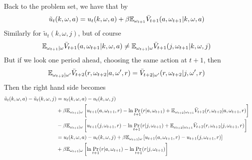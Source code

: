\documentclass[12pt]{article}[margin=1in]
\begin{document}
Back to the problem set, we have that by 
$$ \tilde{u}_t(k, \omega, a) = u_t(k, \omega, a) + \beta \mathbb{E}_{\omega_{t+1}} \bar{V}_{t+1}(a, \omega_{t+1}| k, \omega, a) $$
Similarly for $\tilde{u}_t(k, \omega, j)$, but of course 
$$ \mathbb{E}_{\omega_{t+1}|\omega} \bar{V}_{t+1}(a, \omega_{t+1}| k, \omega, a) \neq \mathbb{E}_{\omega_{t+1}|\omega} \bar{V}_{t+1}(j, \omega_{t+1}| k, \omega, j) $$ But if we look one period ahead, choosing the same action at $t+1$, then 
$$ \mathbb{E}_{\omega_{t+2}|\omega'}\bar{V}_{t+2}(r, \omega_{t+2}| a, \omega', r) = \bar{V}_{t+2|\omega'}(r, \omega_{t+2}| j, \omega', r) $$
Then the right hand side becomes
\begin{equation}
    \begin{split}
        \tilde{u}_t(k, \omega, a) - \tilde{u}_t(k, \omega, j) & = u_t(k, \omega, a) - u_t(k, \omega, j)                                                                                                                                                 \\
                                                              & + \beta\mathbb{E}_{\omega_{t+1}|\omega} \left[u_{t+1}(a, \omega_{t+1},r) -\ln \Pr_{t+1}(r | a, \omega_{t+1}) + \mathbb{E}_{\omega_{t+2}|\omega_{t+1}}\bar{V}_{t+2}(r, \omega_{t+2}| a, \omega_{t+1}, r)\right] \\
                                                              & - \beta\mathbb{E}_{\omega_{t+1}|\omega} \left[u_{t+1}(j, \omega_{t+1},r) -\ln \Pr_{t+1}(r| j, \omega_{t+1}) + \mathbb{E}_{\omega_{t+2}|\omega_{t+1}}\bar{V}_{t+2}(r, \omega_{t+2}| j, \omega_{t+1}, r)\right]  \\
                                                              & = u_t(k, \omega, a) - u_t(k, \omega, j) + \beta \mathbb{E}_{\omega_{t+1}|\omega} \left[u_{t+1}(a, \omega_{t+1},r) - u_{t+1}(j, \omega_{t+1},r)\right]                                                  \\
                                                              & + \beta \mathbb{E}_{\omega_{t+1}|\omega} \left[\ln \Pr_{t+1}(r | a, \omega_{t+1}) - \ln \Pr_{t+1}(r | j, \omega_{t+1})\right]
    \end{split}
\end{equation}
\end{document}
